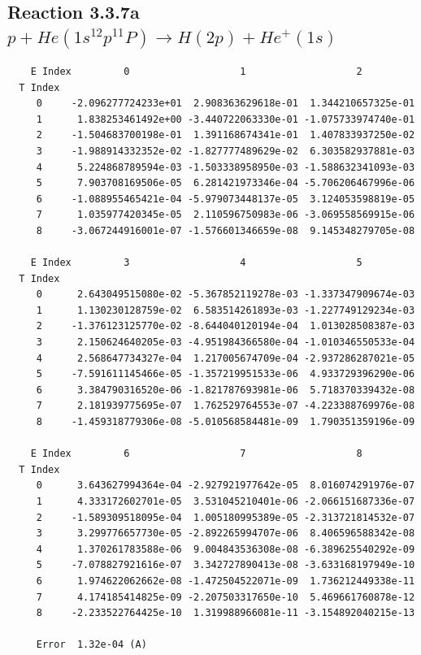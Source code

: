 \documentclass[12pt,dvipdfmx]{article}
\begin{document}
\newpage
\subsection{
Reaction 3.3.7a $  p + He(1s^12p^11P) \rightarrow H(2p) + He^+(1s)$}


\begin{small}\begin{verbatim}
    E Index         0                   1                   2
  T Index
     0     -2.096277724233e+01  2.908363629618e-01  1.344210657325e-01
     1      1.838253461492e+00 -3.440722063330e-01 -1.075733974740e-01
     2     -1.504683700198e-01  1.391168674341e-01  1.407833937250e-02
     3     -1.988914332352e-02 -1.827777489629e-02  6.303582937881e-03
     4      5.224868789594e-03 -1.503338958950e-03 -1.588632341093e-03
     5      7.903708169506e-05  6.281421973346e-04 -5.706206467996e-06
     6     -1.088955465421e-04 -5.979073448137e-05  3.124053598819e-05
     7      1.035977420345e-05  2.110596750983e-06 -3.069558569915e-06
     8     -3.067244916001e-07 -1.576601346659e-08  9.145348279705e-08

    E Index         3                   4                   5
  T Index
     0      2.643049515080e-02 -5.367852119278e-03 -1.337347909674e-03
     1      1.130230128759e-02  6.583514261893e-03 -1.227749129234e-03
     2     -1.376123125770e-02 -8.644040120194e-04  1.013028508387e-03
     3      2.150624640205e-03 -4.951984366580e-04 -1.010346550533e-04
     4      2.568647734327e-04  1.217005674709e-04 -2.937286287021e-05
     5     -7.591611145466e-05 -1.357219951533e-06  4.933729396290e-06
     6      3.384790316520e-06 -1.821787693981e-06  5.718370339432e-08
     7      2.181939775695e-07  1.762529764553e-07 -4.223388769976e-08
     8     -1.459318779306e-08 -5.010568584481e-09  1.790351359196e-09

    E Index         6                   7                   8
  T Index
     0      3.643627994364e-04 -2.927921977642e-05  8.016074291976e-07
     1      4.333172602701e-05  3.531045210401e-06 -2.066151687336e-07
     2     -1.589309518095e-04  1.005180995389e-05 -2.313721814532e-07
     3      3.299776657730e-05 -2.892265994707e-06  8.406596588342e-08
     4      1.370261783588e-06  9.004843536308e-08 -6.389625540292e-09
     5     -7.078827921616e-07  3.342727890413e-08 -3.633168197949e-10
     6      1.974622062662e-08 -1.472504522071e-09  1.736212449338e-11
     7      4.174185414825e-09 -2.207503317650e-10  5.469661760878e-12
     8     -2.233522764425e-10  1.319988966081e-11 -3.154892040215e-13

     Error  1.32e-04 (A)
\end{verbatim}\end{small}
\end{document}
